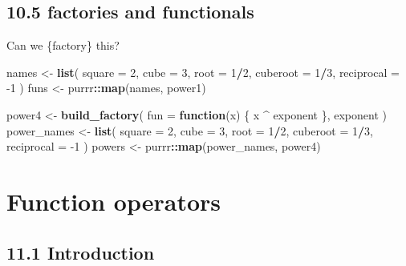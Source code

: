 \documentclass[]{book}
\newenvironment{Shaded}{\begin{snugshade}}{\end{snugshade}}
\newcommand{\ControlFlowTok}[1]{\textcolor[rgb]{0.13,0.29,0.53}{\textbf{#1}}}
\newcommand{\DataTypeTok}[1]{\textcolor[rgb]{0.13,0.29,0.53}{#1}}
\newcommand{\DecValTok}[1]{\textcolor[rgb]{0.00,0.00,0.81}{#1}}
\newcommand{\KeywordTok}[1]{\textcolor[rgb]{0.13,0.29,0.53}{\textbf{#1}}}
\newcommand{\NormalTok}[1]{#1}
\newcommand{\OperatorTok}[1]{\textcolor[rgb]{0.81,0.36,0.00}{\textbf{#1}}}
\newcommand{\StringTok}[1]{\textcolor[rgb]{0.31,0.60,0.02}{#1}}
\begin{document}
\hypertarget{factories-and-functionals}{%
\section{10.5 factories and functionals}\label{factories-and-functionals}}

Can we \{factory\} this?

\begin{Shaded}
\begin{Highlighting}[]
\NormalTok{names <-}\StringTok{ }\KeywordTok{list}\NormalTok{(}
  \DataTypeTok{square =} \DecValTok{2}\NormalTok{, }
  \DataTypeTok{cube =} \DecValTok{3}\NormalTok{, }
  \DataTypeTok{root =} \DecValTok{1}\OperatorTok{/}\DecValTok{2}\NormalTok{, }
  \DataTypeTok{cuberoot =} \DecValTok{1}\OperatorTok{/}\DecValTok{3}\NormalTok{, }
  \DataTypeTok{reciprocal =} \DecValTok{-1}
\NormalTok{)}
\NormalTok{funs <-}\StringTok{ }\NormalTok{purrr}\OperatorTok{::}\KeywordTok{map}\NormalTok{(names, power1)}
\end{Highlighting}
\end{Shaded}

\begin{Shaded}
\begin{Highlighting}[]
\NormalTok{power4 <-}\StringTok{ }\KeywordTok{build_factory}\NormalTok{(}
  \DataTypeTok{fun =} \ControlFlowTok{function}\NormalTok{(x) \{}
\NormalTok{    x }\OperatorTok{^}\StringTok{ }\NormalTok{exponent}
\NormalTok{  \},}
\NormalTok{  exponent}
\NormalTok{)}
\NormalTok{power_names <-}\StringTok{ }\KeywordTok{list}\NormalTok{(}
  \DataTypeTok{square =} \DecValTok{2}\NormalTok{,}
  \DataTypeTok{cube =} \DecValTok{3}\NormalTok{,}
  \DataTypeTok{root =} \DecValTok{1}\OperatorTok{/}\DecValTok{2}\NormalTok{,}
  \DataTypeTok{cuberoot =} \DecValTok{1}\OperatorTok{/}\DecValTok{3}\NormalTok{,}
  \DataTypeTok{reciprocal =} \DecValTok{-1}
\NormalTok{)}
\NormalTok{powers <-}\StringTok{ }\NormalTok{purrr}\OperatorTok{::}\KeywordTok{map}\NormalTok{(power_names, power4)}
\end{Highlighting}
\end{Shaded}

\hypertarget{function-operators}{%
\chapter{Function operators}\label{function-operators}}

\hypertarget{introduction-1}{%
\section*{11.1 Introduction}\label{introduction-1}}
\end{document}
